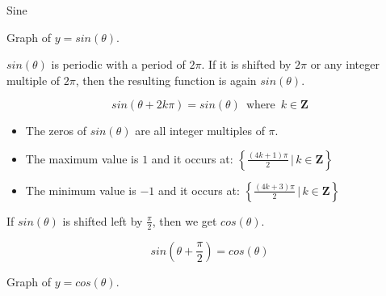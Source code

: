\documentclass{ximera}
\begin{document}
\begin{example} Sine



Graph of $y = sin(\theta)$.

\begin{image}
\end{image}



$sin(\theta)$ is periodic with a period of $2\pi$.  If it is shifted by $2\pi$ or any integer multiple of $2\pi$, then the resulting function is again $sin(\theta)$.


\[    sin(\theta + 2k\pi) = sin(\theta)   \,   \text{ where }  \,  k \in \textbf{Z}       \]



\begin{itemize}
\item The zeros of $sin(\theta)$ are all integer multiples of $\pi$.
\item The maximum value is $1$ and it occurs at:  $\left\{     \frac{(4k+1)\pi}{2} \, | \, k \in \textbf{Z}     \right\}$
\item The minimum value is $-1$ and it occurs at:  $\left\{    \frac{(4k+3)\pi}{2} \, | \, k \in \textbf{Z}     \right\}$
\end{itemize}


If $sin(\theta)$ is shifted left by $\frac{\pi}{2}$, then we get $cos(\theta)$.


\[    sin\left(\theta + \frac{\pi}{2}\right) = cos(\theta)   \]


Graph of $y = cos(\theta)$.


\end{example}
\end{document}
